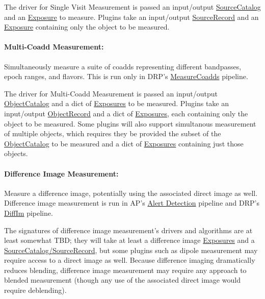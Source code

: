The driver for Single Visit Measurement is passed an input/output \hyperref[sec:spTablesSource]{SourceCatalog} and an \hyperref[sec:spImagesExposure]{Exposure} to measure.  Plugins take an input/output \hyperref[sec:spTablesSource]{SourceRecord} and an \hyperref[sec:spImagesExposure]{Exposure} containing only the object to be measured.

\paragraph{Multi-Coadd Measurement:} Simultaneously measure a suite of coadds representing different bandpasses, epoch ranges, and flavors.  This is run only in DRP's \hyperref[sec:drpMeasureCoadds]{MeasureCoadds} pipeline.
\label{sec:acMultiCoaddMeasurement}

The driver for Multi-Coadd Measurement is passed an input/output \hyperref[sec:spTablesObject]{ObjectCatalog} and a dict of \hyperref[sec:spImagesExposure]{Exposures} to be measured.  Plugins take an input/output \hyperref[sec:spTablesObject]{ObjectRecord} and a dict of \hyperref[sec:spImagesExposure]{Exposures}, each containing only the object to be measured.  Some plugins will also support simultanous measurement of multiple objects, which requires they be provided the subset of the \hyperref[sec:spTablesObject]{ObjectCatalog} to be measured and a dict of \hyperref[sec:spImagesExposure]{Exposures} containing just those objects.

\paragraph{Difference Image Measurement:} Measure a difference image, potentially using the associated direct image as well.  Difference image measurement is run in AP's \hyperref[sec:apAlertDetection]{Alert Detection} pipeline and DRP's \hyperref[sec:drpDiffIm]{DiffIm} pipeline.
\label{sec:acDiffImMeasurement}

The signatures of difference image measurement's drivers and algorithms are at least somewhat TBD; they will take at least a difference image \hyperref[sec:spImagesExposure]{Exposures} and a \hyperref[sec:spTablesSource]{SourceCatalog/SourceRecord}, but some plugins such as dipole measurement may require access to a direct image as well.  Because difference imaging dramatically reduces blending, difference image measurement may require any approach to blended measurement (though any use of the associated direct image would require deblending).

